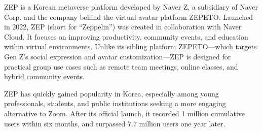 





ZEP is a Korean metaverse platform developed by Naver Z, a subsidiary of Naver Corp. and the company behind the virtual avatar platform ZEPETO. Launched in 2022, ZEP (short for “Zeppelin”) was created in collaboration with Naver Cloud. It focuses on improving productivity, community events, and education within virtual environments. Unlike its sibling platform ZEPETO—which targets Gen Z’s social expression and avatar customization—ZEP is designed for practical group use cases such as remote team meetings, online classes, and hybrid community events.  

ZEP has quickly gained popularity in Korea, especially among young professionals, students, and public institutions seeking a more engaging alternative to Zoom. After its official launch, it recorded 1 million cumulative users within six months, and surpassed 7.7 million users one year later.  


